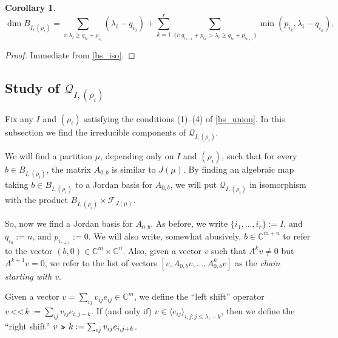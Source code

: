 \documentclass[12pt,psamsfonts]{article}
\newcommand{\leftshift}{\,\texttt{<<}\,}
\newcommand{\rightshift}{\mathbin{\rotatebox[origin=c]{180}{\leftshift}}}
\newtheorem{corollary}[theorem]{Corollary}
\begin{document}
\begin{corollary}\label{bs_dim}
    \[\dim B_{I, (\rho_i)} = \sum_{i : \lambda_i \geq q_{i_0} + \rho_{i_1}} (\lambda_i - q_{i_0}) + \sum_{k = 1}^r \sum_{\{i : q_{i_{k - 1}} + p_{i_k} > \lambda_i \geq q_{i_k} + p_{i_{k + 1}}\}} \min(p_{i_k}, \lambda_i - q_{i_k}).\]
\end{corollary}
\begin{proof}
    Immediate from \cref{bs_iso}.
\end{proof}

\subsection{Study of \texorpdfstring{\(\mathcal{Q}_{I, (\rho_i)}\)}{Q\_\{I, (p\_i)\}}}
Fix any \(I\) and \((\rho_i)\) satisfying the conditions (1)--(4) of \cref{bs_union}.
In this subsection we find the irreducible components of \(\mathcal{Q}_{I, (\rho_i)}\).
\par We will find a partition \(\mu\), depending only on \(I\) and \((\rho_i)\), such that for every \(b \in B_{I, (\rho_i)}\), the matrix \(A_{0,b}\) is similar to \(J(\mu)\).
By finding an algebraic map taking \(b \in B_{I, (\rho_i)}\) to a Jordan basis for \(A_{0,b}\), we will put \(\mathcal{Q}_{I, (\rho_i)}\) in isomorphism with the product \(B_{I, (\rho_i)} \times \mathcal{F}_{J(\mu)}\).
\par So, now we find a Jordan basis for \(A_{0, b}\).
As before, we write \(\{i_1, ..., i_r\} := I\), and \(q_{i_0} := n\), and \(p_{i_{r + 1}} := 0\).
We will also write, somewhat abusively, \(b \in \mathbb{C}^{m + n}\) to refer to the vector \((b, 0) \in \mathbb{C}^{m} \times \mathbb{C}^n\).
Also, given a vector \(v\) such that \(A^k v \neq 0\) but \(A^{k + 1} v = 0\), we refer to the list of vectors \([v, A_{0,b} v, ..., A_{0,b}^k v]\) as the \emph{chain starting with \(v\)}.
\par Given a vector \(v = \sum_{ij} v_{ij} e_{ij} \in \mathbb{C}^m\), we define the ``left shift'' operator \(v \leftshift k := \sum_{ij} v_{ij} e_{i,j - k}\).
If (and only if) \(v \in \langle e_{ij} \rangle_{i,j: j \leq \lambda_i - k}\), then we define the ``right shift'' \(v \rightshift k := \sum_{ij} v_{ij} e_{i,j + k}\).
\end{document}

